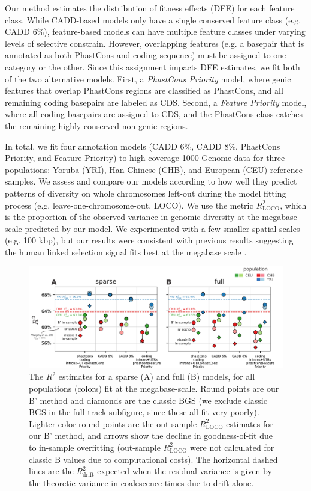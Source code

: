 \documentclass[11pt]{article}
\begin{document}
Our method estimates the distribution of fitness effects (DFE) for each feature
class. While CADD-based models only have a single conserved feature class (e.g.
CADD 6\%), feature-based models can have multiple feature classes under varying
levels of selective constrain. However, overlapping features (e.g. a basepair
that is annotated as both PhastCons and coding sequence) must be assigned to
one category or the other. Since this assignment impacts DFE estimates, we fit
both of the two alternative models. First, a \emph{PhastCons Priority} model,
where genic features that overlap PhastCons regions are classified as
PhastCons, and all remaining coding basepairs are labeled as CDS. Second, a
\emph{Feature Priority} model, where all coding basepairs are assigned to CDS,
and the PhastCons class catches the remaining highly-conserved non-genic
regions. 

In total, we fit four annotation models (CADD 6\%, CADD 8\%, PhastCons
Priority, and Feature Priority) to high-coverage 1000 Genome data for three
populations: Yoruba (YRI), Han Chinese (CHB), and European (CEU) reference
samples. We assess and compare our models according to how well they predict
patterns of diversity on whole chromosomes left-out during the model fitting
process (e.g. leave-one-chromosome-out, LOCO). We use the metric
$R_\text{LOCO}^2$, which is the proportion of the observed variance in genomic
diversity at the megabase scale predicted by our model. We experimented with a
few smaller spatial scales (e.g. 100 kbp), but our results were consistent with
previous results suggesting the human linked selection signal fits best at the
megabase scale \parencite{Murphy2022-sj}.

\begin{figure}[htbp] \centering
    \includegraphics[width=\textwidth]{figures/figure_3.pdf} 

    \caption{The $R^2$ estimates for a sparse (A) and full (B) models, for all
        populations (colors) fit at the megabase-scale. Round points are our B'
        method and diamonds are the classic BGS (we exclude classic BGS in the
        full track subfigure, since these all fit very poorly). Lighter color
        round points are the out-sample $R_\text{LOCO}^2$ estimates for our B'
        method, and arrows show the decline in goodness-of-fit due to in-sample
        overfitting (out-sample $R_\text{LOCO}^2$ were not calculated for
        classic B values due to computational costs). The horizontal dashed
        lines are the $R_\text{drift}^2$ expected when the residual variance is
    given by the theoretic variance in coalescence times due to drift alone.}

  \label{fig:figure-2}
\end{figure}
\end{document}
